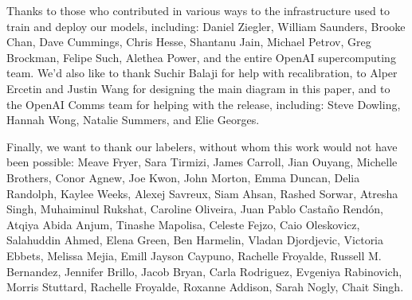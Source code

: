 Thanks to those who contributed in various ways to the infrastructure used to train and deploy our models, including: Daniel Ziegler, William Saunders, Brooke Chan, Dave Cummings, Chris Hesse, Shantanu Jain, Michael Petrov, Greg Brockman, Felipe Such, Alethea Power, and the entire OpenAI supercomputing team. We'd also like to thank Suchir Balaji for help with recalibration, to Alper Ercetin and Justin Wang for designing the main diagram in this paper, and to the OpenAI Comms team for helping with the release, including: Steve Dowling, Hannah Wong, Natalie Summers, and Elie Georges.

Finally, we want to thank our labelers, without whom this work would not have been possible: Meave Fryer, Sara Tirmizi, James Carroll, Jian Ouyang, Michelle Brothers, Conor Agnew, Joe Kwon, John Morton, Emma Duncan, Delia Randolph, Kaylee Weeks, Alexej Savreux, Siam Ahsan, Rashed Sorwar, Atresha Singh, Muhaiminul Rukshat, Caroline Oliveira, Juan Pablo Casta{\~n}o Rend{\'o}n, Atqiya Abida Anjum, Tinashe Mapolisa, Celeste Fejzo, Caio Oleskovicz, Salahuddin Ahmed, Elena Green, Ben Harmelin, Vladan Djordjevic, Victoria Ebbets, Melissa Mejia, Emill Jayson Caypuno, Rachelle Froyalde, Russell M. Bernandez, Jennifer Brillo, Jacob Bryan, Carla Rodriguez, Evgeniya Rabinovich, Morris Stuttard, Rachelle Froyalde, Roxanne Addison, Sarah Nogly, Chait Singh.


